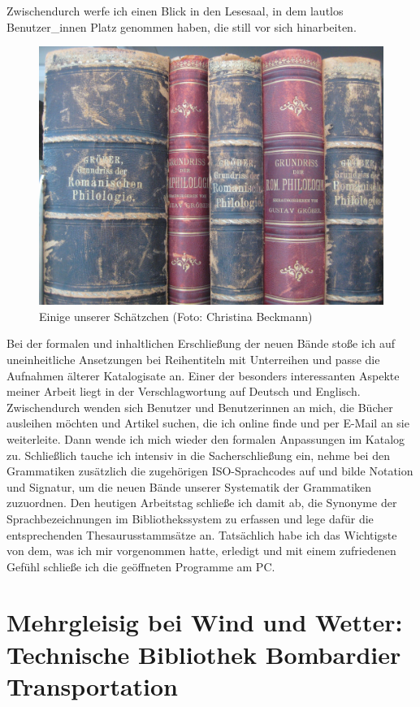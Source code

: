 \documentclass[a4paper,
fontsize=11pt,
oneside,
numbers=noperiodatend,
parskip=half-,
bibliography=totoc,
final
]{scrartcl}
\begin{document}
Zwischendurch werfe ich einen Blick in den Lesesaal, in dem lautlos
Benutzer\_innen Platz genommen haben, die still vor sich hinarbeiten.

\begin{figure}
\centering
\includegraphics{img/Beckmann_2.jpg}
\caption{Einige unserer Schätzchen (Foto: Christina Beckmann)}
\end{figure}

Bei der formalen und inhaltlichen Erschließung der neuen Bände stoße ich
auf uneinheitliche Ansetzungen bei Reihentiteln mit Unterreihen und
passe die Aufnahmen älterer Katalogisate an. Einer der besonders
interessanten Aspekte meiner Arbeit liegt in der Verschlagwortung auf
Deutsch und Englisch. Zwischendurch wenden sich Benutzer und
Benutzerinnen an mich, die Bücher ausleihen möchten und Artikel suchen,
die ich online finde und per E-Mail an sie weiterleite. Dann wende ich
mich wieder den formalen Anpassungen im Katalog zu. Schließlich tauche
ich intensiv in die Sacherschließung ein, nehme bei den Grammatiken
zusätzlich die zugehörigen ISO-Sprachcodes auf und bilde Notation und
Signatur, um die neuen Bände unserer Systematik der Grammatiken
zuzuordnen. Den heutigen Arbeitstag schließe ich damit ab, die Synonyme
der Sprachbezeichnungen im Bibliothekssystem zu erfassen und lege dafür
die entsprechenden Thesaurusstammsätze an. Tatsächlich habe ich das
Wichtigste von dem, was ich mir vorgenommen hatte, erledigt und mit
einem zufriedenen Gefühl schließe ich die geöffneten Programme am PC.

\hypertarget{mehrgleisig-bei-wind-und-wetter-technische-bibliothek-bombardier-transportation}{%
\section*{Mehrgleisig bei Wind und Wetter: Technische Bibliothek
Bombardier
Transportation}\label{mehrgleisig-bei-wind-und-wetter-technische-bibliothek-bombardier-transportation}}
\end{document}
